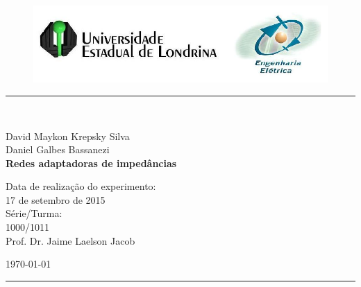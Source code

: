 \begin{titlepage}
\begin{center}
\begin{figure}[h]
\includegraphics[scale=0.76]{Imagens/topdotitulo.png}
\end{figure}
\rule{\columnwidth}{1.5mm}
\

\large David Maykon Krepsky Silva\\
\large Daniel Galbes Bassanezi\\

\vspace{4cm}
{\bf \Large Redes adaptadoras de impedâncias}
\vspace{3.5cm}

\begin{flushright}
Data de realização do experimento:\\
17 de setembro de 2015\\
Série/Turma:\\
1000/1011\\
Prof. Dr. Jaime Laelson Jacob 
\end{flushright}

\vspace{3.2cm}
\today

\rule{\columnwidth}{1.3mm}
\end{center}
\end{titlepage}
